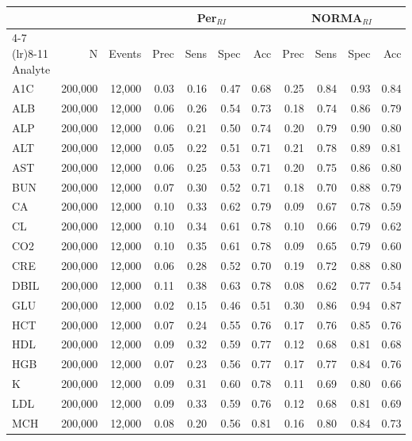 \begin{table}[ht]
\centering
\footnotesize
\begin{tabular}{lrrrrrrrrrr}
\toprule
 & &  & \multicolumn{4}{c}{Per$_{RI}$} & \multicolumn{4}{c}{NORMA$_{RI}$} \\
\cmidrule(lr){4-7} \cmidrule(lr){8-11}
Analyte & N & Events & Prec & Sens & Spec & Acc & Prec & Sens & Spec & Acc \\
\midrule
A1C & 200,000 & 12,000 & 0.03 & 0.16 & 0.47 & 0.68 & 0.25 & 0.84 & 0.93 & 0.84 \\
ALB & 200,000 & 12,000 & 0.06 & 0.26 & 0.54 & 0.73 & 0.18 & 0.74 & 0.86 & 0.79 \\
ALP & 200,000 & 12,000 & 0.06 & 0.21 & 0.50 & 0.74 & 0.20 & 0.79 & 0.90 & 0.80 \\
ALT & 200,000 & 12,000 & 0.05 & 0.22 & 0.51 & 0.71 & 0.21 & 0.78 & 0.89 & 0.81 \\
AST & 200,000 & 12,000 & 0.06 & 0.25 & 0.53 & 0.71 & 0.20 & 0.75 & 0.86 & 0.80 \\
BUN & 200,000 & 12,000 & 0.07 & 0.30 & 0.52 & 0.71 & 0.18 & 0.70 & 0.88 & 0.79 \\
CA & 200,000 & 12,000 & 0.10 & 0.33 & 0.62 & 0.79 & 0.09 & 0.67 & 0.78 & 0.59 \\
CL & 200,000 & 12,000 & 0.10 & 0.34 & 0.61 & 0.78 & 0.10 & 0.66 & 0.79 & 0.62 \\
CO2 & 200,000 & 12,000 & 0.10 & 0.35 & 0.61 & 0.78 & 0.09 & 0.65 & 0.79 & 0.60 \\
CRE & 200,000 & 12,000 & 0.06 & 0.28 & 0.52 & 0.70 & 0.19 & 0.72 & 0.88 & 0.80 \\
DBIL & 200,000 & 12,000 & 0.11 & 0.38 & 0.63 & 0.78 & 0.08 & 0.62 & 0.77 & 0.54 \\
GLU & 200,000 & 12,000 & 0.02 & 0.15 & 0.46 & 0.51 & 0.30 & 0.86 & 0.94 & 0.87 \\
HCT & 200,000 & 12,000 & 0.07 & 0.24 & 0.55 & 0.76 & 0.17 & 0.76 & 0.85 & 0.76 \\
HDL & 200,000 & 12,000 & 0.09 & 0.32 & 0.59 & 0.77 & 0.12 & 0.68 & 0.81 & 0.68 \\
HGB & 200,000 & 12,000 & 0.07 & 0.23 & 0.56 & 0.77 & 0.17 & 0.77 & 0.84 & 0.76 \\
K & 200,000 & 12,000 & 0.09 & 0.31 & 0.60 & 0.78 & 0.11 & 0.69 & 0.80 & 0.66 \\
LDL & 200,000 & 12,000 & 0.09 & 0.33 & 0.59 & 0.76 & 0.12 & 0.68 & 0.81 & 0.69 \\
MCH & 200,000 & 12,000 & 0.08 & 0.20 & 0.56 & 0.81 & 0.16 & 0.80 & 0.84 & 0.73 \\

\end{tabular}
\end{table}
